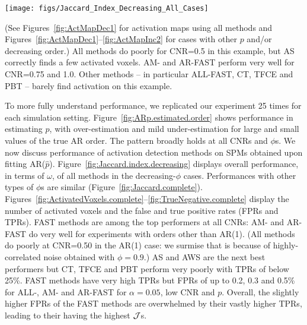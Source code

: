 \begin{figure*}
  \begin{center}
\texttt{[image: figs/Jaccard\_Index\_Decreasing\_All\_Cases]}
\caption{Performance of the activation detection algorithms for different
  settings and when the AR coefficient decreases with order.
For clarity, each setting displays performance of the methods in the
same order as in the legend. 
}
\label{fig:Jaccard.index.decreasing}
  \end{center}
\end{figure*}
(See Figures~\ref{fig:ActMapDec1} for activation maps using all
methods and Figures~\ref{fig:ActMapDec1}--\ref{fig:ActMapInc2} for cases with
other $p$ and/or decreasing order.) All methods do poorly for CNR=0.5
in this example, but AS correctly finds a few activated voxels. AM-
and AR-FAST perform 
very well for CNR=0.75 and 1.0. Other methods -- in
particular ALL-FAST, CT, TFCE and PBT -- barely find  activation on
this example. 

To more fully understand performance, we replicated our experiment
25 times for each simulation setting. Figure~\ref{fig:ARp.estimated.order} shows performance in
estimating $p$, with over-estimation and mild under-estimation  
for large and small values of the true AR order. The pattern
broadly holds at all CNRs and $\phi$s. We now discuss performance of 
activation detection methods on SPMs obtained upon fitting AR($\hat p$). 
Figure~\ref{fig:Jaccard.index.decreasing} displays  overall
performance, in terms of $\omega$, of all methods in the
decreasing-$\phi$ cases. Performances with other types of $\phi$s
are similar
(Figure~\ref{fig:Jaccard.complete}). Figures~\ref{fig:ActivatedVoxels.complete}--\ref{fig:TrueNegative.complete} display the number of activated 
voxels and the false and true positive rates (FPRs and TPRs). %
FAST methods are among the top performers at all CNRs: AM- and
AR-FAST do very well for experiments with orders other than
AR(1). (All methods do poorly at CNR=0.50 in the AR(1) case: we 
surmise that is because of highly-correlated noise obtained with  $\phi=0.9$.)
AS and AWS are the next best  performers but CT, TFCE and PBT perform  
very poorly with  TPRs of below 25\%. FAST
methods have very high TPRs but FPRs of up to 
0.2, 0.3 and 0.5\% for ALL-, AM- and AR-FAST  for $\alpha = 0.05$, 
low CNR and $p$.
Overall, the slightly higher FPRs of the  FAST methods are overwhelmed
by their vastly higher TPRs, leading to their having the highest $\mathcal J$s.

